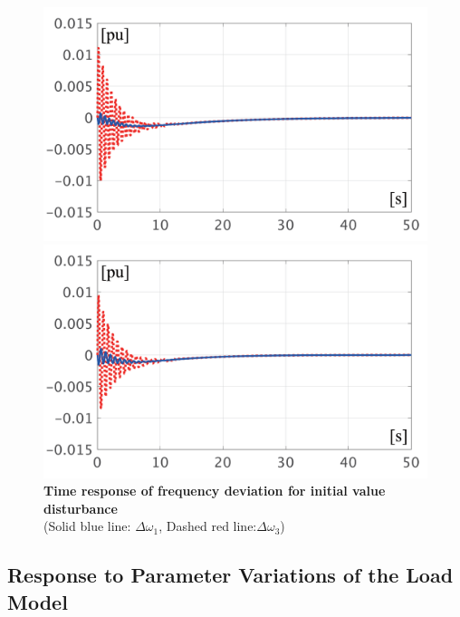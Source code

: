 \documentclass[graybox, envcountchap]{svmult}
\begin{document}
\begin{figure}[t]
  \centering
  {
  \begin{minipage}{0.49\linewidth}
    \centering
    \includegraphics[width = 1.0\linewidth]{figs/P1ini}
  \end{minipage}
  \begin{minipage}{0.49\linewidth}
    \centering
    \includegraphics[width = 1.0\linewidth]{figs/P3ini}
  \end{minipage}
  \medskip
  \caption{\textbf{Time response of frequency deviation for initial value
  disturbance}
  \\ \centering(Solid blue line: $\Delta \omega_1$, Dashed red line:$\Delta \omega_3$)}
  \label{fig:P13ini}
  }
\medskip
\end{figure}

\subsection{Response to Parameter Variations of the Load
Model}\label{sec:resldpara}
\end{document}
